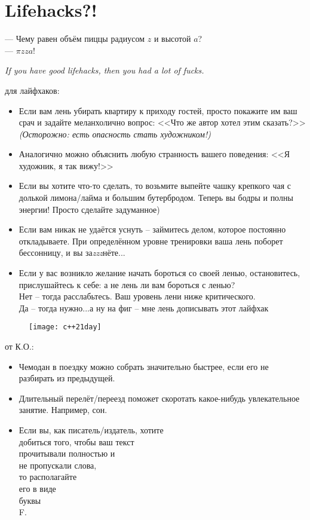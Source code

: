 \section{Lifehacks?!}
\begin{epigraph}
    --- Чему равен объём пиццы радиусом \( z \) и высотой \( a \)?\\
    --- \( \pi z z a \)!
\end{epigraph}

\noindent\emph{If you have good lifehacks, then you had a lot of fucks.}

 для лайфхаков:
\begin{itemize}
    \item Если вам лень убирать квартиру к приходу гостей, просто покажите им ваш срач и задайте меланхолично вопрос: <<Что же автор хотел этим сказать?>> \emph{(Осторожно: есть опасность стать художником!)}
    \item Аналогично можно объяснить любую странность вашего поведения: <<Я художник, я так вижу!>>
    \item Если вы хотите что-то сделать, то возьмите выпейте чашку крепкого чая с долькой лимона/лайма и большим бутербродом. Теперь вы бодры и полны энергии! Просто сделайте задуманное)
    \item Если вам никак не удаётся уснуть -- займитесь делом, которое постоянно откладываете. При определённом уровне тренировки ваша лень поборет бессонницу, и вы за\emph{zzz}нёте...
    \item Если у вас возникло желание начать бороться со своей ленью, остановитесь, прислушайтесь к себе: а не лень ли вам бороться с ленью?\\
        Нет -- тогда расслабьтесь. Ваш уровень лени ниже критического.\\
        Да -- тогда нужно...а ну на фиг -- мне лень дописывать этот лайфхак
\end{itemize}

\pagebreak

\begin{figure}[ht!]
    \centering
    \texttt{[image: c++21day]}
\end{figure}

 от К.О.:
\begin{itemize}
    \item Чемодан в поездку можно собрать значительно быстрее, если его не разбирать из предыдущей.
    \item Длительный перелёт/переезд поможет скоротать какое-нибудь увлекательное занятие. Например, сон.
    \item Если вы, как писатель/издатель, хотите \\
        добиться того, чтобы ваш текст \\
        прочитывали полностью и \\
        не пропускали слова, \\
        то располагайте \\
        его в виде \\
        буквы \\
        F.
\end{itemize}
